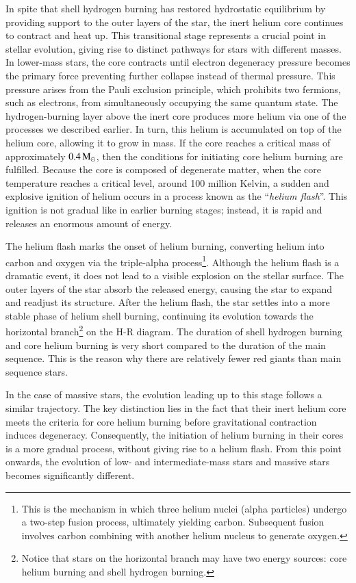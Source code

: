 \documentclass[main.tex]{subfiles}
\begin{document}
    In spite that shell hydrogen burning has restored hydrostatic equilibrium by providing support to the outer layers of the star, the inert helium core continues to contract and heat up.
    This transitional stage represents a crucial point in stellar evolution, giving rise to distinct pathways for stars with different masses. In lower-mass stars, the core contracts until electron degeneracy pressure becomes the primary force preventing further collapse instead of thermal pressure. This pressure arises from the Pauli exclusion principle, which prohibits two fermions, such as electrons, from simultaneously occupying the same quantum state. The hydrogen-burning layer above the inert core produces more helium via one of the processes we described earlier. In turn, this helium is accumulated on top of the helium core, allowing it to grow in mass. If the core reaches a critical mass of approximately $0.4\mathrm{\,M_\odot}$, then the conditions for initiating core helium burning are fulfilled. Because the core is composed of degenerate matter, when the core temperature reaches a critical level, around 100 million Kelvin, a sudden and explosive ignition of helium occurs in a process known as the ``\textit{helium flash}''. This ignition is not gradual like in earlier burning stages; instead, it is rapid and releases an enormous amount of energy. 
    
    The helium flash marks the onset of helium burning, converting helium into carbon and oxygen via the triple-alpha process\footnote{This is the mechanism in which three helium nuclei (alpha particles) undergo a two-step fusion process, ultimately yielding carbon. Subsequent fusion involves carbon combining with another helium nucleus to generate oxygen.}.
    Although the helium flash is a dramatic event, it does not lead to a visible explosion on the stellar surface. The outer layers of the star absorb the released energy, causing the star to expand and readjust its structure. After the helium flash, the star settles into a more stable phase of helium shell burning, continuing its evolution towards the horizontal branch\footnote{Notice that stars on the horizontal branch may have two energy sources: core helium burning and shell hydrogen burning.} on the H-R diagram. The duration of shell hydrogen burning and core helium burning is very short compared to the duration of the main sequence. This is the reason why there are relatively fewer red giants than main sequence stars.

    In the case of massive stars, the evolution leading up to this stage follows a similar trajectory. The key distinction lies in the fact that their inert helium core meets the criteria for core helium burning before gravitational contraction induces degeneracy. Consequently, the initiation of helium burning in their cores is a more gradual process, without giving rise to a helium flash. From this point onwards, the evolution of low- and intermediate-mass stars and massive stars becomes significantly different. 
    
\end{document}
